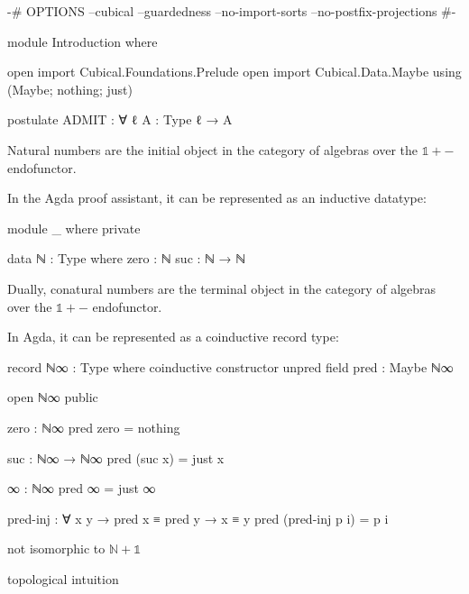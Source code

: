 \begin{code}[hide]
{-# OPTIONS --cubical --guardedness --no-import-sorts --no-postfix-projections #-}

module Introduction where

open import Cubical.Foundations.Prelude
open import Cubical.Data.Maybe using (Maybe; nothing; just)

postulate
  ADMIT : ∀ {ℓ} {A : Type ℓ} → A
\end{code}
Natural numbers are the initial object in the category of algebras over the
$\mathbb{1} + {-}$ endofunctor.

In the Agda proof assistant, it can be represented as an inductive datatype:

\begin{code}[hide]
module _ where private
\end{code}
\begin{code}
  data ℕ : Type where
    zero  : ℕ
    suc   : ℕ → ℕ
\end{code}

Dually, conatural numbers are the terminal object in the category of algebras
over the $\mathbb{1} + {-}$ endofunctor.

In Agda, it can be represented as a coinductive record type:

\begin{code}
record ℕ∞ : Type where
  coinductive
  constructor unpred
  field
    pred : Maybe ℕ∞
\end{code}
\begin{code}[hide]
open ℕ∞ public
\end{code}

\begin{code}
zero : ℕ∞
pred zero = nothing

suc : ℕ∞ → ℕ∞
pred (suc x) = just x

∞ : ℕ∞
pred ∞ = just ∞

pred-inj : ∀ {x y} → pred x ≡ pred y → x ≡ y
pred (pred-inj p i) = p i
\end{code}

not isomorphic to $\mathbb{N} + \mathbb{1}$

topological intuition

\begin{center}
\end{center}

